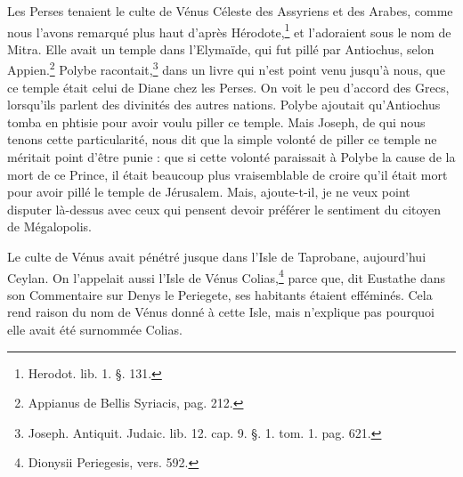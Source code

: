 \documentclass[a4paper, 18pt, oneside]{article}
\begin{document}
Les Perses tenaient le culte de Vénus Céleste des Assyriens et des Arabes, comme nous l'avons remarqué plus haut d'après Hérodote,\footnote{Herodot. lib. 1. §. 131.} et l'adoraient sous le nom de Mitra. Elle avait un temple dans l'Elymaïde, qui fut pillé par Antiochus, selon Appien.\footnote{Appianus de Bellis Syriacis, pag. 212.} Polybe racontait,\footnote{Joseph. Antiquit. Judaic. lib. 12. cap. 9. §. 1. tom. 1. pag. 621.} dans un livre qui n'est point venu jusqu'à nous, que ce temple était celui de Diane chez les Perses. On voit le peu d'accord des Grecs, lorsqu'ils parlent des divinités des autres nations. Polybe ajoutait qu'Antiochus tomba en phtisie pour avoir voulu piller ce temple. Mais Joseph, de qui nous tenons cette particularité, nous dit que la simple volonté de piller ce temple ne méritait point d'être punie : que si cette volonté paraissait à Polybe la cause de la mort de ce Prince, il était beaucoup plus vraisemblable de croire qu'il était mort pour avoir pillé le temple de Jérusalem. Mais, ajoute-t-il, je ne veux point disputer là-dessus avec ceux qui pensent devoir préférer le sentiment du citoyen de Mégalopolis.

Le culte de Vénus avait pénétré jusque dans l'Isle de Taprobane, aujourd'hui Ceylan. On l'appelait aussi l'Isle de Vénus Colias,\footnote{Dionysii Periegesis, vers. 592.} parce que, dit Eustathe dans son Commentaire sur Denys le Periegete, ses habitants étaient efféminés. Cela rend raison du nom de Vénus donné à cette Isle, mais n'explique pas pourquoi elle avait été surnommée Colias.
\end{document}
